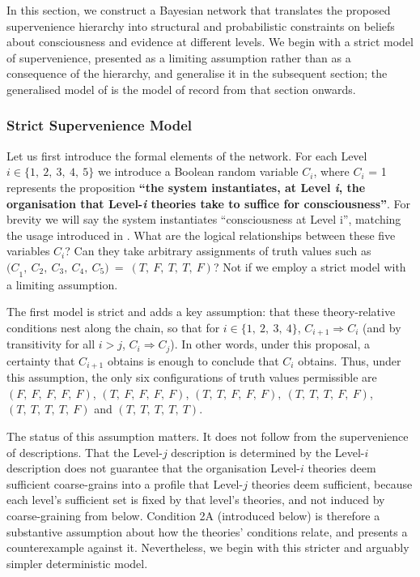 \documentclass[11pt, a4paper, onecolumn, gdm]{google}
\begin{document}
In this section, we construct a Bayesian network that translates the proposed supervenience hierarchy into structural and probabilistic constraints on beliefs about consciousness and evidence at different levels.
We begin with a strict model of supervenience, presented as a limiting assumption rather than as a consequence of the hierarchy, and generalise it in the subsequent section; the generalised model of  is the model of record from that section onwards.

\subsubsection{Strict Supervenience Model}\label{strict-supervenience-model}

Let us first introduce the formal elements of the network.
For each Level \(i \in \{ 1,\ 2,\ 3,\ 4,\ 5\}\) we introduce a Boolean random variable \(C_{i}\), where \(C_{i}\) = 1 represents the proposition \textbf{``the system instantiates, at Level \emph{i}, the organisation that Level-\emph{i} theories take to suffice for consciousness''}.
For brevity we will say the system instantiates ``consciousness at Level i'', matching the usage introduced in .
What are the logical relationships between these five variables \(C_{i}\)?
Can they take arbitrary assignments of truth values such as \({(C}_{1},\ C_{2},\ C_{3},\ C_{4},\ C_{5})\  = \ (T,\ F,\ T,\ T,\ F)\)?
Not if we employ a strict model with a limiting assumption.

The first model is strict and adds a key assumption: that these theory-relative conditions nest along the chain, so that for \(i \in \{ 1,\ 2,\ 3,\ 4\}\), \(C_{i + 1} \Rightarrow C_{i}\) (and by transitivity for all \(i > j\), \(C_{i} \Rightarrow C_{j}\)).
In other words, under this proposal, a certainty that \(C_{i + 1}\) obtains is enough to conclude that \(C_{i}\) obtains.
Thus, under this assumption, the only six configurations of truth values permissible are \((F,\ F,\ F,\ F,\ F)\), \((T,\ F,\ F,\ F,\ F)\), \((T,\ T,\ F,\ F,\ F),\ (T,\ T,\ T,\ F,\ F)\), \((T,\ T,\ T,\ T,\ F)\) and \((T,\ T,\ T,\ T,\ T)\).

The status of this assumption matters.
It does not follow from the supervenience of descriptions.
That the Level-\(j\) description is determined by the Level-\(i\) description does not guarantee that the organisation Level-\(i\) theories deem sufficient coarse-grains into a profile that Level-\(j\) theories deem sufficient, because each level's sufficient set is fixed by that level's theories, and not induced by coarse-graining from below.
Condition 2A (introduced below) is therefore a substantive assumption about how the theories' conditions relate, and  presents a counterexample against it.
Nevertheless, we begin with this stricter and arguably simpler deterministic model.
\end{document}

